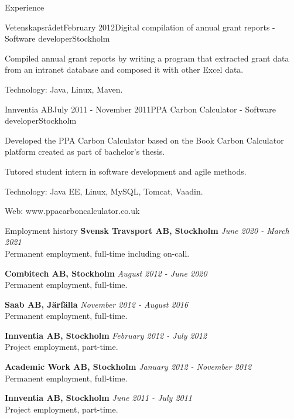 \documentclass{resume}
\begin{document}
\begin{rSection}{Experience}
    \begin{rSubsection}{Vetenskapsrådet}{February 2012}{Digital compilation of annual grant reports - Software developer}{Stockholm}
      \item Compiled annual grant reports by writing a program that extracted grant data from an intranet database and composed it with other Excel data.
      \item Technology: Java, Linux, Maven.
    \end{rSubsection}

    \begin{rSubsection}{Innventia AB}{July 2011 - November 2011}{PPA Carbon Calculator - Software developer}{Stockholm}
      \item Developed the PPA Carbon Calculator based on the Book Carbon Calculator platform created as part of bachelor's thesis.
      \item Tutored student intern in software development and agile methods.
      \item Technology: Java EE, Linux, MySQL, Tomcat, Vaadin.
      \item Web: www.ppacarboncalculator.co.uk
    \end{rSubsection}
  \end{rSection}

  \newpage
  \begin{rSection}{Employment history}
  {\bf Svensk Travsport AB, Stockholm}
    \hfill {\em June 2020 - March 2021 } \\
    { Permanent employment, full-time including on-call. }

    {\bf Combitech AB, Stockholm}
    \hfill {\em August 2012 - June 2020 } \\
    { Permanent employment, full-time. }

    {\bf Saab AB, Järfälla}
    \hfill {\em November 2012 - August 2016 } \\
    { Permanent employment, full-time. }

    {\bf Innventia AB, Stockholm}
    \hfill {\em February 2012 - July 2012 } \\
    { Project employment, part-time. }

    {\bf Academic Work AB, Stockholm}
    \hfill {\em January 2012 - November 2012 } \\
    { Permanent employment, full-time. }

    {\bf Innventia AB, Stockholm}
    \hfill {\em June 2011 - July 2011 } \\
    { Project employment, part-time. }
  \end{rSection}
\end{document}
